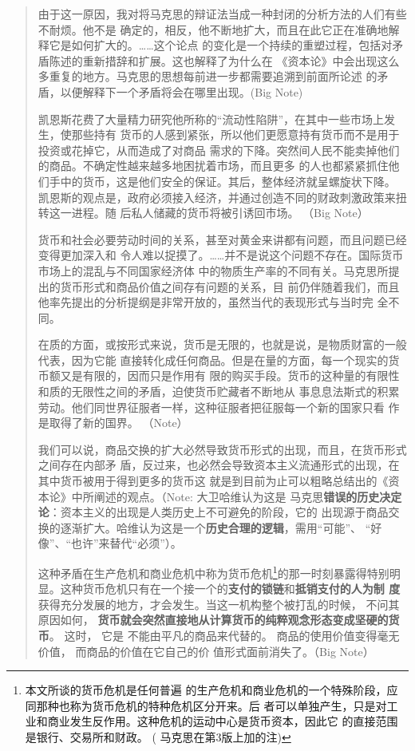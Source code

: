 \begin{quotation}
由于这一原因，我对将马克思的辩证法当成一种封闭的分析方法的人们有些不耐烦。他不是
确定的，相反，他不断地扩大，而且在此它正在准确地解释它是如何扩大的。……这个论点
的变化是一个持续的重塑过程，包括对矛盾陈述的重新措辞和扩展。这也解释了为什么在
《资本论》中会出现这么多重复的地方。马克思的思想每前进一步都需要追溯到前面所论述
的矛盾，以便解释下一个矛盾将会在哪里出现。(Big
Note)

凯恩斯花费了大量精力研究他所称的“流动性陷阱”，在其中一些市场上发生，使那些持有
货币的人感到紧张，所以他们更愿意持有货币而不是用于投资或花掉它，从而造成了对商品
需求的下降。突然间人民不能卖掉他们的商品。不确定性越来越多地困扰着市场，而且更多
的人也都紧紧抓住他们手中的货币，这是他们安全的保证。其后，整体经济就呈螺旋状下降。
凯恩斯的观点是，政府必须接入经济，并通过创造不同的财政刺激政策来扭转这一进程。随
后私人储藏的货币将被引诱回市场。 （Big Note）

货币和社会必要劳动时间的关系，甚至对黄金来讲都有问题，而且问题已经变得更加深入和
令人难以捉摸了。……并不是说这个问题不存在。国际货币市场上的混乱与不同国家经济体
中的物质生产率的不同有关。马克思所提出的货币形式和商品价值之间存有问题的关系，目
前仍伴随着我们，而且他率先提出的分析提纲是非常开放的，虽然当代的表现形式与当时完
全不同。

在质的方面，或按形式来说，货币是无限的，也就是说，是物质财富的一般代表，因为它能
直接转化成任何商品。但是在量的方面，每一个现实的货币额又是有限的，因而只是作用有
限的购买手段。货币的这种量的有限性和质的无限性之间的矛盾，迫使货币贮藏者不断地从
事息息法斯式的积累劳动。他们同世界征服者一样，这种征服者把征服每一个新的国家只看
作是取得了新的国界。 （Note）

我们可以说，商品交换的扩大必然导致货币形式的出现，而且，在货币形式之间存在内部矛
盾，反过来，也必然会导致资本主义流通形式的出现，在其中货币被用于得到更多的货币这
就是到目前为止可以粗略总结出的《资本论》中所阐述的观点。（Note: 大卫哈维认为这是
马克思\textbf{错误的历史决定论}：资本主义的出现是人类历史上不可避免的阶段，它的
出现源于商品交换的逐渐扩大。哈维认为这是一个\textbf{历史合理的逻辑}，需用“可能”、
“好像”、“也许”来替代“必须”）。

这种矛盾在生产危机和商业危机中称为货币危机\footnote{本文所谈的货币危机是任何普遍
的生产危机和商业危机的一个特殊阶段，应同那种也称为货币危机的特种危机区分开来。后
者可以单独产生，只是对工业和商业发生反作用。这种危机的运动中心是货币资本，因此它
的直接范围是银行、交易所和财政。 ( 马克思在第3版上加的注)}的那一时刻暴露得特别明
显。这种货币危机只有在一个接一个的\textbf{支付的锁链}和\textbf{抵销支付的人为制
度}获得充分发展的地方，才会发生。当这一机构整个被打乱的时候， 不问其原因如何，
\textbf{货币就会突然直接地从计算货币的纯粹观念形态变成坚硬的货币}。 这时， 它是
不能由平凡的商品来代替的。 商品的使用价值变得毫无价值， 而商品的价值在它自己的价
值形式面前消失了。（Big Note）


\end{quotation}
